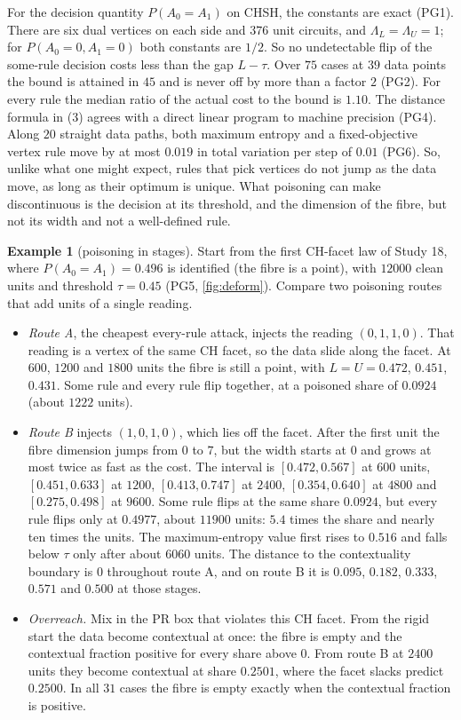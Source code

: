 \documentclass[11pt]{article}
\theoremstyle{definition}\newtheorem{definition}[theorem]{Definition}\newtheorem{remark}[theorem]{Remark}\newtheorem{example}[theorem]{Example}\newtheorem{problem}[theorem]{Open problem}\crefname{problem}{Problem}{Problems}
\begin{document}
For the decision quantity $P(A_0=A_1)$ on CHSH, the constants are exact (PG1). There are six dual vertices on each side and $376$ unit circuits, and $\Lambda_L=\Lambda_U=1$; for $P(A_0=0,A_1=0)$ both constants are $1/2$. So no undetectable flip of the some-rule decision costs less than the gap $L-\tau$. Over $75$ cases at $39$ data points the bound is attained in $45$ and is never off by more than a factor $2$ (PG2). For every rule the median ratio of the actual cost to the bound is $1.10$. The distance formula in (3) agrees with a direct linear program to machine precision (PG4). Along $20$ straight data paths, both maximum entropy and a fixed-objective vertex rule move by at most $0.019$ in total variation per step of $0.01$ (PG6). So, unlike what one might expect, rules that pick vertices do not jump as the data move, as long as their optimum is unique. What poisoning can make discontinuous is the decision at its threshold, and the dimension of the fibre, but not its width and not a well-defined rule.

\begin{example}[poisoning in stages]\label{ex:stages}
Start from the first CH-facet law of Study 18, where $P(A_0=A_1)=0.496$ is identified (the fibre is a point), with $12000$ clean units and threshold $\tau=0.45$ (PG5, \cref{fig:deform}). Compare two poisoning routes that add units of a single reading.
\begin{itemize}
\item \emph{Route A}, the cheapest every-rule attack, injects the reading $(0,1,1,0)$. That reading is a vertex of the same CH facet, so the data slide along the facet. At $600$, $1200$ and $1800$ units the fibre is still a point, with $L=U=0.472$, $0.451$, $0.431$. Some rule and every rule flip together, at a poisoned share of $0.0924$ (about $1222$ units).
\item \emph{Route B} injects $(1,0,1,0)$, which lies off the facet. After the first unit the fibre dimension jumps from $0$ to $7$, but the width starts at $0$ and grows at most twice as fast as the cost. The interval is $[0.472,0.567]$ at $600$ units, $[0.451,0.633]$ at $1200$, $[0.413,0.747]$ at $2400$, $[0.354,0.640]$ at $4800$ and $[0.275,0.498]$ at $9600$. Some rule flips at the same share $0.0924$, but every rule flips only at $0.4977$, about $11900$ units: $5.4$ times the share and nearly ten times the units. The maximum-entropy value first rises to $0.516$ and falls below $\tau$ only after about $6060$ units. The distance to the contextuality boundary is $0$ throughout route A, and on route B it is $0.095$, $0.182$, $0.333$, $0.571$ and $0.500$ at those stages.
\item \emph{Overreach.} Mix in the PR box that violates this CH facet. From the rigid start the data become contextual at once: the fibre is empty and the contextual fraction positive for every share above $0$. From route B at $2400$ units they become contextual at share $0.2501$, where the facet slacks predict $0.2500$. In all $31$ cases the fibre is empty exactly when the contextual fraction is positive.
\end{itemize}
\end{example}
\end{document}

